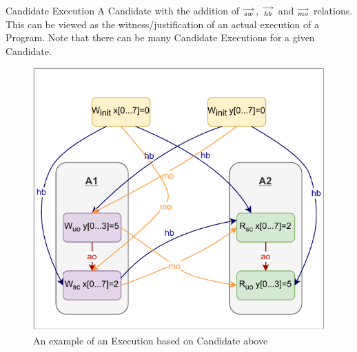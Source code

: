     \begin{definition}{Candidate Execution}
        A Candidate with the addition of $\stackrel{\longrightarrow}{_{sw}}$, $\stackrel{\longrightarrow}{_{hb}}$ and $\stackrel{\longrightarrow}{_{mo}}$ relations. This can be viewed as the witness/justification of an actual execution of a Program. Note that there can be many Candidate Executions for a given Candidate.
        
        \begin{figure}[H]
            \centering
            \includegraphics[scale=0.7]{Execution.pdf}
            \caption{An example of an Execution based on Candidate above}
            \label{fig:my_label}
        \end{figure}
        
    \end{definition}
    
    
